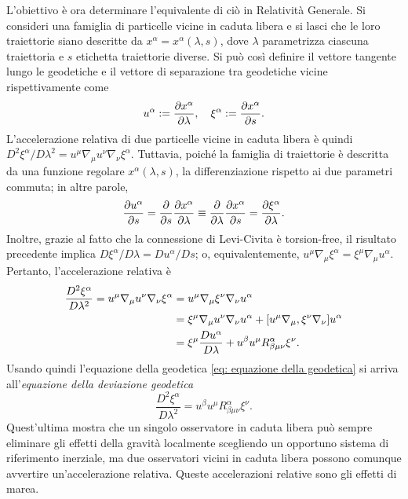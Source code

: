 L'obiettivo è ora determinare l'equivalente di ciò in Relatività Generale. Si consideri una famiglia di particelle vicine in caduta libera e si lasci che le loro traiettorie siano descritte da $x^\alpha = x^\alpha(\lambda, s)$, dove $\lambda$ parametrizza ciascuna traiettoria e $s$ etichetta traiettorie diverse. Si può così definire il vettore tangente lungo le geodetiche e il vettore di separazione tra geodetiche vicine rispettivamente come
\begin{equation}
    u^\alpha := \frac{\partial x^\alpha}{\partial \lambda},\quad \xi^\alpha := \frac{\partial x^\alpha}{\partial s}.
\end{equation}
L'accelerazione relativa di due particelle vicine in caduta libera è quindi $D^2 \xi^\alpha / D \lambda^2 = u^\mu \nabla_\mu u^\nu \nabla_\nu \xi^\alpha$. Tuttavia, poiché la famiglia di traiettorie è descritta da una funzione regolare $x^\alpha(\lambda, s)$, la differenziazione rispetto ai due parametri commuta; in altre parole,
\begin{equation}
    \frac{\partial u^\alpha}{\partial s} = \frac{\partial}{\partial s} \frac{\partial x^\alpha}{\partial \lambda} \equiv \frac{\partial}{\partial \lambda} \frac{\partial x^\alpha}{\partial s} = \frac{\partial \xi^\alpha}{\partial \lambda}.
\end{equation}
Inoltre, grazie al fatto che la connessione di Levi-Civita è torsion-free, il risultato precedente implica $D\xi^\alpha / D\lambda = Du^\alpha / Ds$; o, equivalentemente, $u^\mu \nabla_\mu \xi^\alpha = \xi^\mu \nabla_\mu u^\alpha$. Pertanto, l'accelerazione relativa è
\begin{equation}
    \begin{split}
        \frac{D^2 \xi^\alpha}{D\lambda^2} = u^\mu \nabla_\mu u^\nu \nabla_\nu \xi^\alpha &= u^\mu \nabla_\mu \xi^\nu \nabla_\nu u^\alpha \\
        &= \xi^\mu \nabla_\mu u^\nu \nabla_\nu u^\alpha + [u^\mu\nabla_\mu,\xi^\nu\nabla_\nu] u^\alpha \\
        &= \xi^\mu \frac{Du^\alpha}{D\lambda} + u^\beta u^\mu R^{\alpha}_{\beta\mu\nu} \xi^\nu.
    \end{split}
\end{equation}
Usando quindi l'equazione della geodetica \eqref{eq: equazione della geodetica} si arriva all'\emph{equazione della deviazione geodetica}
\begin{equation}
\label{eq: equazione della deviazione geodetica}
    \frac{D^2 \xi^\alpha}{D\lambda^2} = u^\beta u^\mu R^{\alpha}_{\beta\mu\nu} \xi^\nu.
\end{equation}
Quest'ultima mostra che un singolo osservatore in caduta libera può sempre eliminare gli effetti della gravità localmente scegliendo un opportuno sistema di riferimento inerziale, ma due osservatori vicini in caduta libera possono comunque avvertire un'accelerazione relativa. Queste accelerazioni relative sono gli effetti di marea.

